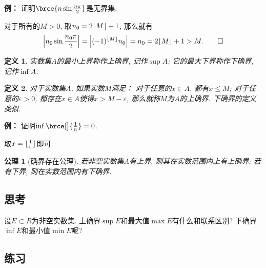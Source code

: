 \documentclass[a4paper,punct=CCT]{ctexbook}
\makeatletter
\theoremstyle{break}
\newtheorem*{definition*}{定义}
\newtheorem*{axiom*}{公理}
\newif\ifshowsol
\newif\ifshowex
\renewenvironment{proof}[1][\proofname]{\par
  \pushQED{\qed}%
  \normalfont \topsep6\p@\@plus6\p@\relax
  \trivlist
  \item[]\ignorespaces
}{%
  \popQED\endtrivlist\@endpefalse
}
\newenvironment{example}[1][]{\noindent\textbf{例#1：}}{}
\let\leq\leqslant
\let\le\leq
\makeatother
\begin{document}
\begin{example}
  证明\(\brce{n \sin \frac{n\pi}2}\)是无界集.
\end{example}

\begin{proof}
  对于所有的\(M > 0\), 取\(n_0 = 2 \floor M + 1\), 那么就有
  \[
    \abs[\Big]{n_0 \sin \frac{n_0\pi}2} = \abs[\Big]{(-1)^{\floor M} n_0} = n_0 = 2 \floor M + 1 > M. \qedhere
  \]
\end{proof}

\begin{definition*}
  实数集\(A\)的最小上界称作上确界, 记作\(\sup A\); 它的最大下界称作下确界, 记作\(\inf A\).
\end{definition*}

\begin{definition*}
  对于实数集\(A\), 如果实数\(M\)满足： 对于任意的\(x \in A\), 都有\(x \le M \);  对于任意的\(\varepsilon > 0\), 都存在\(x \in A\)使得\(x > M - \varepsilon\), 那么就称\(M\)为\(A\)的上确界.  下确界的定义类似.
\end{definition*}

\begin{example}
  证明\(\inf\brce[\big]{\frac1n} = 0\).
\end{example}

\begin{proof}
  取\(x = \floor{\frac1\varepsilon}\)即可.
\end{proof}

\begin{axiom*}[确界存在公理]
  若非空实数集\(A\)有上界, 则其在实数范围内上有上确界; 若有下界, 则在实数范围内有下确界.
\end{axiom*}

\subsection*{思考}

设\(E \subset R\)为非空实数集.  上确界\(\sup E\)和最大值\(\max E\)有什么和联系区别?  下确界\(\inf E\)和最小值\(\min E\)呢?

\ifshowsol
如果\(E\)有最大值, 则\(\sup E = \max E\).  最小值的情况同理.
\fi

\ifshowex
{}
\subsection*{练习}
\end{document}
